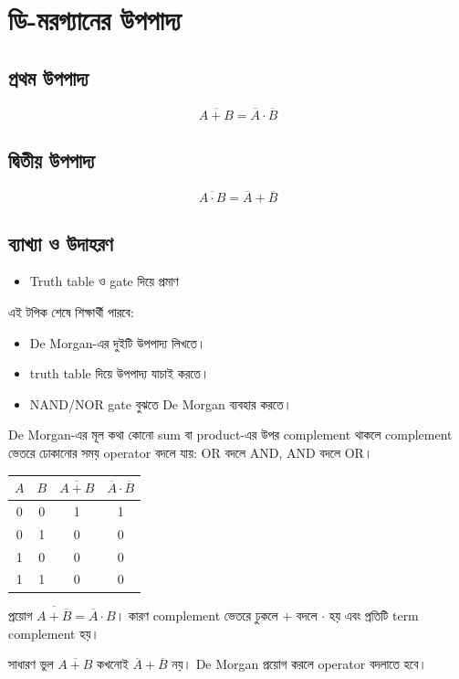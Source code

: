 \section{ডি-মরগ্যানের উপপাদ্য}

\subsection{প্রথম উপপাদ্য}
\[
\overline{A+B} = \overline{A} \cdot \overline{B}
\]

\subsection{দ্বিতীয় উপপাদ্য}
\[
\overline{A \cdot B} = \overline{A} + \overline{B}
\]

\subsection{ব্যাখ্যা ও উদাহরণ}
\begin{itemize}
\item Truth table ও gate দিয়ে প্রমাণ
\end{itemize}

\begin{learningbox}
এই টপিক শেষে শিক্ষার্থী পারবে:
\begin{itemize}
\item De Morgan-এর দুইটি উপপাদ্য লিখতে।
\item truth table দিয়ে উপপাদ্য যাচাই করতে।
\item NAND/NOR gate বুঝতে De Morgan ব্যবহার করতে।
\end{itemize}
\end{learningbox}

\begin{definitionbox}{De Morgan-এর মূল কথা}
কোনো sum বা product-এর উপর complement থাকলে complement ভেতরে ঢোকানোর সময় operator বদলে যায়: OR বদলে AND, AND বদলে OR।
\end{definitionbox}

\begin{center}
\begin{tabular}{|c|c|c|c|}
\hline
$A$ & $B$ & $\overline{A+B}$ & $\overline{A}\cdot\overline{B}$ \\
\hline
0 & 0 & 1 & 1 \\
\hline
0 & 1 & 0 & 0 \\
\hline
1 & 0 & 0 & 0 \\
\hline
1 & 1 & 0 & 0 \\
\hline
\end{tabular}
\end{center}

\begin{examplebox}{প্রয়োগ}
$\overline{A+\overline{B}}=\overline{A}\cdot B$। কারণ complement ভেতরে ঢুকলে $+$ বদলে $\cdot$ হয় এবং প্রতিটি term complement হয়।
\end{examplebox}

\begin{mistakebox}{সাধারণ ভুল}
$\overline{A+B}$ কখনোই $\overline{A}+\overline{B}$ নয়। De Morgan প্রয়োগ করলে operator বদলাতে হবে।
\end{mistakebox}

